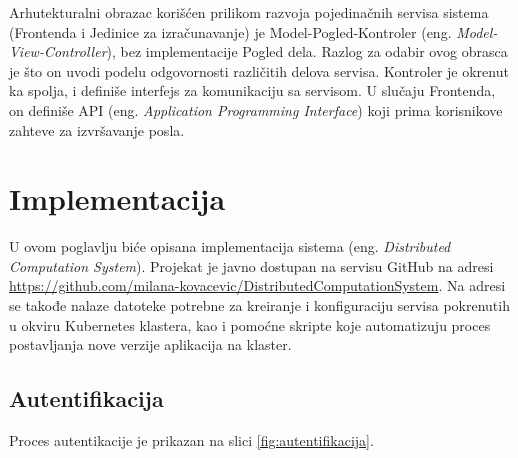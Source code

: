 \documentclass[12pt,oneside]{memoir}
\begin{document}
Arhutekturalni obrazac korišćen prilikom razvoja pojedinačnih servisa sistema (Frontenda i Jedinice za izračunavanje) je Model-Pogled-Kontroler (eng. \emph{Model-View-Controller}), bez implementacije Pogled dela. Razlog za odabir ovog obrasca je što on uvodi podelu odgovornosti različitih delova servisa. Kontroler je okrenut ka spolja, i definiše interfejs za komunikaciju sa servisom. U slučaju Frontenda, on definiše API (eng. \emph{Application Programming Interface}) koji prima korisnikove zahteve za izvršavanje posla.


\section{Implementacija}

U ovom poglavlju biće opisana implementacija sistema (eng. \emph{Distributed Computation System}).
Projekat je javno dostupan na servisu GitHub na adresi \href{https://github.com/milana-kovacevic/DistributedComputationSystem}{https://github.com/milana-kovacevic/DistributedComputationSystem}. Na adresi se takođe nalaze datoteke potrebne za kreiranje i konfiguraciju servisa pokrenutih u okviru Kubernetes klastera, kao i pomoćne skripte koje automatizuju proces postavljanja nove verzije aplikacija na klaster.


\subsection{Autentifikacija}

Proces autentikacije je prikazan na slici \ref{fig:autentifikacija}.
\end{document}
